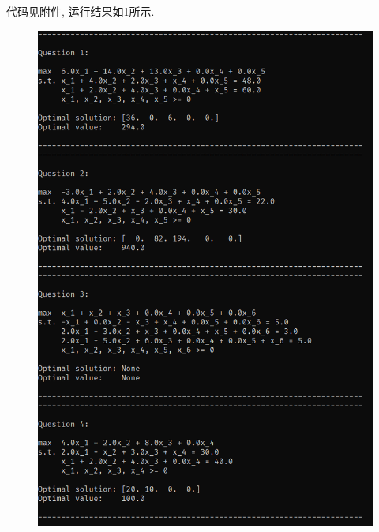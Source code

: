 代码见附件, 运行结果如\cref{figure:14-1}所示.

\begin{figure}
    \centering
    \includegraphics[width=\textwidth]{figures/14-1.png}
    \caption{}
    \label{figure:14-1}
\end{figure}
